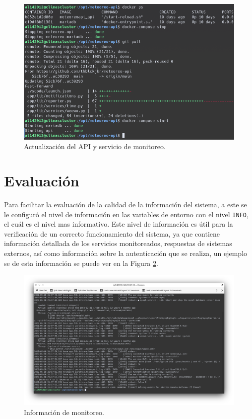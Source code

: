 \begin{figure}[!ht]
	\centering
	\includegraphics[width=0.9\linewidth]{images/screenshots/meteoreo-api-update.png}
	\caption{Actualización del API y servicio de monitoreo.}
	\label{fig:uploading-web}
\end{figure}

\section{Evaluación}

Para facilitar la evaluación de la calidad de la información del sistema, a este se le configuró el nivel de información en las variables de entorno con el nivel \texttt{INFO}, el cuál es el nivel mas informativo. Este nivel de información es útil para la verificación de un correcto funcionamiento del sistema, ya que contiene información detallada de los servicios monitoreados, respuestas de sistemas externos, así como información sobre la autenticación que se realiza, un ejemplo se de esta información se puede ver en la Figura \ref{fig:meteoreo-api-monitoring}.

\begin{figure}[!ht]
	\centering
	\includegraphics[width=1\linewidth]{images/screenshots/meteoreo-api-monitoring.png}
	\caption{Información de monitoreo.}
	\label{fig:meteoreo-api-monitoring}
\end{figure}


